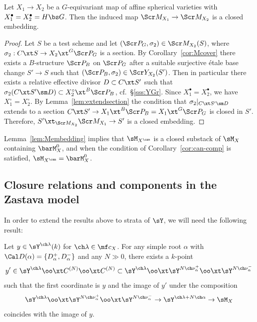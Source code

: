 \begin{lem}
\notready\label{lem:Membedding}
Let $X_1 \to X_2$ be a $G$-equivariant map of affine spherical varieties with $X_1^\bullet = X_2^\bullet = H\bs G$. Then the induced map $\Scr M_{X_1} \to \Scr M_{X_2}$ is a closed embedding.
\end{lem}
\begin{proof}
Let $S$ be a test scheme and let $(\Scr P_G,\sigma_2) \in \Scr M_{X_2}(S)$, where
$\sigma_2 : C\xt S \to X_2 \xt^G \Scr P_G$ is a section.
By Corollary~\ref{cor:Mcover} there exists a $B$-structure $\Scr P_B$
on $\Scr P_G$ after a suitable surjective \'etale base change $S'\to S$
such that $(\Scr P_B, \sigma_2)\in \Scr Y_{X_2}(S')$. Then in particular
there exists a relative effective divisor $D \subset C\xt S'$ such that
$\sigma_2(C\xt S' \sm D) \subset X_2^\circ \xt^B \Scr P_B$, cf.~\S\ref{sss:YGr}.
Since $X_1^\bullet=X_2^\bullet$, we have $X_1^\circ=X_2^\circ$.
By Lemma~\ref{lem:extendsection} the condition that $\sigma_2|_{C\xt S'\sm D}$
extends to a section $C \xt S' \to X_1 \xt^B \Scr P_B = X_1 \xt^G \Scr P_G$ is
closed in $S'$. Therefore, $S' \xt_{\Scr M_{X_2}} \Scr M_{X_1} \to S'$ is a closed
embedding.
\end{proof}

Lemma~\ref{lem:Membedding} implies that
$\sM_{X^\can}$ is a closed substack of $\sM_X$ containing $\barM_X^0$, and when the condition
of Corollary~\ref{cor:can-comp} is satisfied, $\sM_{X^\can} = \barM_X^0$.


\subsection{Closure relations and components in the Zastava model}

In order to extend the results above to strata of $\sY$, we will need the following result:


\begin{lem}
\notready \label{lem:Yraise}
Let $y \in \sY^{\ch\lambda}(k)$ for $\ch\lambda \in \mf c_X$.
For any simple root $\alpha$ with $\Cal D(\alpha) = \{ D_\alpha^+, D_\alpha^- \}$ and any $N \gg 0$, there exists
a $k$-point
\[ y' \in \sY^{\ch\lambda} \oo\xt C^{(N)} \oo\xt C^{(N)} \subset
\sY^{\ch\lambda} \oo\xt \sY^{N\ch\nu_\alpha^+} \oo\xt \sY^{N\ch\nu_\alpha^-}
\]
such that the first coordinate is $y$ and the image of $y'$ under
the composition
\[
    \sY^{\ch\lambda} \oo\xt \sY^{N\ch\nu_\alpha^+} \oo \xt
    \sY^{N\ch\nu_\alpha^-} \to
    \sY^{\ch\lambda+N\ch\alpha} \to \sM_X
\]
coincides with the image of $y$.
\end{lem}

